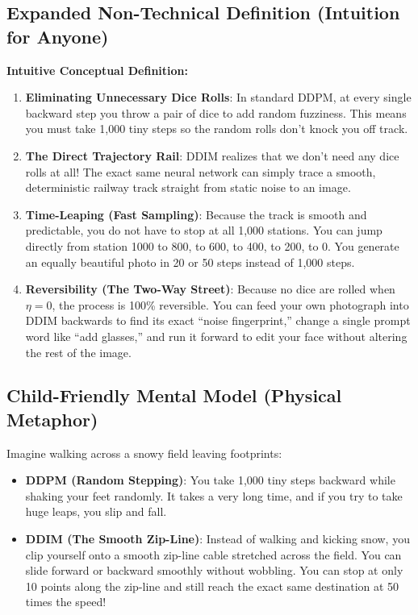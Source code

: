\documentclass[11pt,a4paper]{article}
\theoremstyle{definition}
\begin{document}
\subsection{Expanded Non-Technical Definition (Intuition for Anyone)}
\textbf{Intuitive Conceptual Definition:}
\begin{enumerate}
    \item \textbf{Eliminating Unnecessary Dice Rolls}: In standard DDPM, at every single backward step you throw a pair of dice to add random fuzziness. This means you must take 1,000 tiny steps so the random rolls don't knock you off track.
    \item \textbf{The Direct Trajectory Rail}: DDIM realizes that we don't need any dice rolls at all! The exact same neural network can simply trace a smooth, deterministic railway track straight from static noise to an image.
    \item \textbf{Time-Leaping (Fast Sampling)}: Because the track is smooth and predictable, you do not have to stop at all 1,000 stations. You can jump directly from station 1000 to 800, to 600, to 400, to 200, to 0. You generate an equally beautiful photo in 20 or 50 steps instead of 1,000 steps.
    \item \textbf{Reversibility (The Two-Way Street)}: Because no dice are rolled when $\eta = 0$, the process is 100\% reversible. You can feed your own photograph into DDIM backwards to find its exact ``noise fingerprint,'' change a single prompt word like ``add glasses,'' and run it forward to edit your face without altering the rest of the image.
\end{enumerate}

\subsection{Child-Friendly Mental Model (Physical Metaphor)}
Imagine walking across a snowy field leaving footprints:
\begin{itemize}
    \item \textbf{DDPM (Random Stepping)}: You take 1,000 tiny steps backward while shaking your feet randomly. It takes a very long time, and if you try to take huge leaps, you slip and fall.
    \item \textbf{DDIM (The Smooth Zip-Line)}: Instead of walking and kicking snow, you clip yourself onto a smooth zip-line cable stretched across the field. You can slide forward or backward smoothly without wobbling. You can stop at only 10 points along the zip-line and still reach the exact same destination at 50 times the speed!
\end{itemize}
\end{document}
